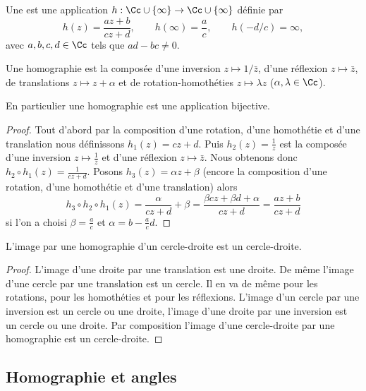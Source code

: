 \documentclass[11pt,class=report,crop=false]{standalone}
\begin{document}
Une  est une application $h : \Cc \cup \{\infty\} \to \Cc \cup \{\infty\}$
définie par 
$$h(z) = \frac{az+b}{cz+d}, \qquad h(\infty)=\frac ac, \qquad h(-d/c)=\infty,$$
avec $a,b,c,d \in \Cc$ tels que $ad-bc \neq 0$.

\begin{proposition}
\label{prop:dechomo}
Une homographie est la composée d'une inversion $z \mapsto 1/\bar z$, d'une réflexion $z\mapsto \bar z$,
de translations $z\mapsto z+\alpha$ et de rotation-homothéties $z\mapsto \lambda z$ ($\alpha, \lambda \in \Cc$).
\end{proposition}

En particulier une homographie est une application bijective.

\begin{proof}
Tout d'abord par la composition d'une rotation, d'une homothétie et d'une translation nous définissons
$h_1(z) = cz+d$. Puis $h_2(z)= \frac 1z$ est la composée d'une inversion $z \mapsto \frac{1}{\bar z}$
et d'une réflexion $z \mapsto \bar z$. Nous obtenons donc 
$h_2 \circ h_1(z) = \frac{1}{cz+d}$.
Posons $h_3(z)= \alpha z + \beta$ (encore la composition d'une rotation, d'une homothétie et d'une translation)
alors
$$h_3\circ h_2 \circ h_1(z) =  \frac{\alpha}{cz+d} + \beta = \frac{\beta c z + \beta d + \alpha}{cz+d}=\frac{az+b}{cz+d} $$
si l'on a choisi $\beta = \frac{a}{c}$ et $\alpha = b - \frac a c d$.
\end{proof}

\begin{corollaire}
L'image par une homographie d'un cercle-droite est un cercle-droite.
\end{corollaire}

\begin{proof}
L'image d'une droite par une translation est une droite. De même l'image d'une cercle par une translation est un cercle.
Il en va de même pour les rotations, pour les homothéties et pour les réflexions.
L'image d'un cercle par une inversion est un cercle ou une droite, l'image d'une droite
par une inversion est un cercle ou une droite. Par composition
l'image d'une cercle-droite par une homographie est un cercle-droite.
\end{proof}




\subsection{Homographie et angles}
\end{document}
